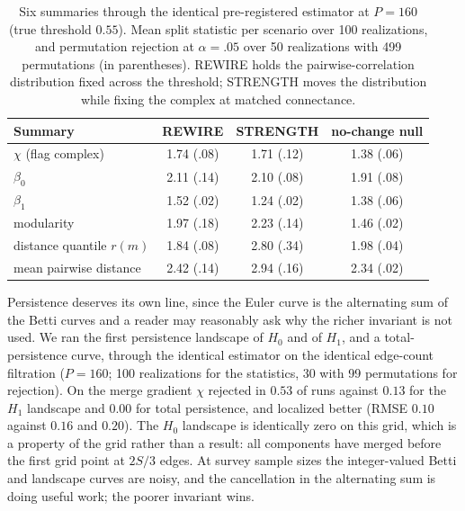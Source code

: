 \documentclass[review,12pt,authoryear]{elsarticle}
\theoremstyle{remark}
\begin{document}
\begin{table}[t]
\centering
\caption{Six summaries through the identical pre-registered estimator at
$P = 160$ (true threshold $0.55$). Mean split statistic per scenario over
100 realizations, and permutation rejection at $\alpha = .05$ over 50
realizations with 499 permutations (in parentheses). REWIRE holds the
pairwise-correlation distribution fixed across the threshold; STRENGTH
moves the distribution while fixing the complex at matched connectance.}
\label{tab:swap}
\begin{tabular}{lccc}
\toprule
Summary & REWIRE & STRENGTH & no-change null \\
\midrule
$\chi$ (flag complex)   & 1.74 (.08) & 1.71 (.12) & 1.38 (.06) \\
$\beta_0$              & 2.11 (.14) & 2.10 (.08) & 1.91 (.08) \\
$\beta_1$              & 1.52 (.02) & 1.24 (.02) & 1.38 (.06) \\
modularity              & 1.97 (.18) & 2.23 (.14) & 1.46 (.02) \\
distance quantile $r(m)$ & 1.84 (.08) & 2.80 (.34) & 1.98 (.04) \\
mean pairwise distance  & 2.42 (.14) & 2.94 (.16) & 2.34 (.02) \\
\bottomrule
\end{tabular}
\end{table}

Persistence deserves its own line, since the Euler curve is the alternating
sum of the Betti curves and a reader may reasonably ask why the richer
invariant is not used. We ran the first persistence landscape of $H_0$ and
of $H_1$, and a total-persistence curve, through the identical estimator on
the identical edge-count filtration ($P = 160$; 100 realizations for the
statistics, 30 with 99 permutations for rejection). On the merge gradient
$\chi$ rejected in $0.53$ of runs against $0.13$ for the $H_1$ landscape
and $0.00$ for total persistence, and localized better (RMSE $0.10$ against
$0.16$ and $0.20$). The $H_0$ landscape is identically zero on this grid,
which is a property of the grid rather than a result: all components have
merged before the first grid point at $2S/3$ edges. At survey sample sizes
the integer-valued Betti and landscape curves are noisy, and the
cancellation in the alternating sum is doing useful work; the poorer
invariant wins.
\end{document}
